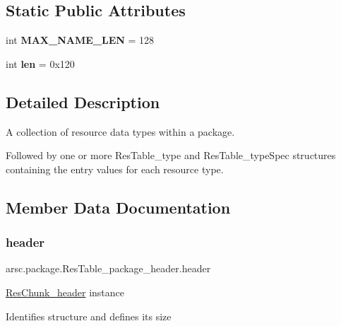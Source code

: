 \subsection*{Static Public Attributes}
\begin{DoxyCompactItemize}
\item 
\mbox{\label{classarsc_1_1package_1_1ResTable__package__header_ad25a82058e022ebf6fd9eec3a0536f64}} 
int {\bfseries M\+A\+X\+\_\+\+N\+A\+M\+E\+\_\+\+L\+EN} = 128
\item 
\mbox{\label{classarsc_1_1package_1_1ResTable__package__header_a6ed4759c4268280b30d6164330412237}} 
int {\bfseries len} = 0x120
\end{DoxyCompactItemize}


\subsection{Detailed Description}
A collection of resource data types within a package. 

Followed by one or more Res\+Table\+\_\+type and Res\+Table\+\_\+type\+Spec structures containing the entry values for each resource type. 

\subsection{Member Data Documentation}
\mbox{\label{classarsc_1_1package_1_1ResTable__package__header_ab92288c84778472ad9bd44c300913f38}} 
\subsubsection{\texorpdfstring{header}{header}}
{\footnotesize\ttfamily arsc.\+package.\+Res\+Table\+\_\+package\+\_\+header.\+header}



\mbox{\hyperlink{}{Res\+Chunk\+\_\+header}} instance 

Identifies structure and defines its size \mbox{\label{classarsc_1_1package_1_1ResTable__package__header_ae0be8e4719350496515e7b83b3e74e38}} 
